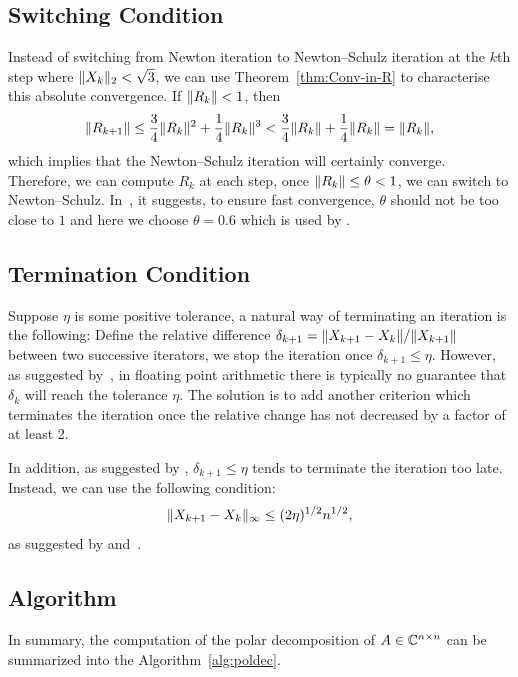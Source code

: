 \documentclass[12pt]{article}
\begin{document}
\subsection{Switching Condition}
Instead of switching from Newton iteration to Newton--Schulz iteration at the $k$th step where $\|{X_k}\|_2 < \sqrt{3}$, we can use Theorem~\ref{thm:Conv-in-R} to characterise this absolute convergence. If $\|{R_{k}}\| < 1$, then 
\begin{equation}
    \notag 
    \|{R_{k+1}}\| \leq \frac{3}{4}\|{R_k}\|^2 + \frac{1}{4}\|{R_k}\|^3 < \frac{3}{4}\|{R_k}\| + \frac{1}{4}\|{R_k}\| = \|{R_k}\|,
\end{equation}
which implies that the Newton--Schulz iteration will certainly converge. Therefore, we can compute $R_{k}$ at each step, once $\|{R_k}\|\leq\theta<1$, we can switch to Newton--Schulz. In~, it suggests, to ensure fast convergence, $\theta$ should not be too close to $1$ and here we choose $\theta = 0.6$ which is used by \cite{hisc90}.

\subsection{Termination Condition}
Suppose $\eta$ is some positive tolerance, a natural way of terminating an iteration is the following: Define the relative difference $\delta_{k+1} = \|{X_{k+1} - X_{k}}\|/\|{X_{k+1}}\|$ between two successive iterators, we stop the iteration once $\delta_{k+1} \leq \eta$. However, as suggested by~, in floating point arithmetic there is typically no guarantee that $\delta_k$ will reach the tolerance $\eta$. The solution is to add another criterion which terminates the iteration once the relative change has not decreased by a factor of at least 2.

In addition, as suggested by , $\delta_{k+1}\leq \eta$ tends to terminate the iteration too late. Instead, we can use the following condition:
\begin{equation}
    \notag 
    \|{X_{k+1} - X_{k}}\|_\infty \le (2\eta)^{1/2}n^{1/2},
\end{equation}
as suggested by  and~.

\subsection{Algorithm}
In summary, the computation of the polar decomposition of $A\in\mathbb{C}^{n\times n}$ can be summarized into the Algorithm~\ref{alg:poldec}.
\end{document}

